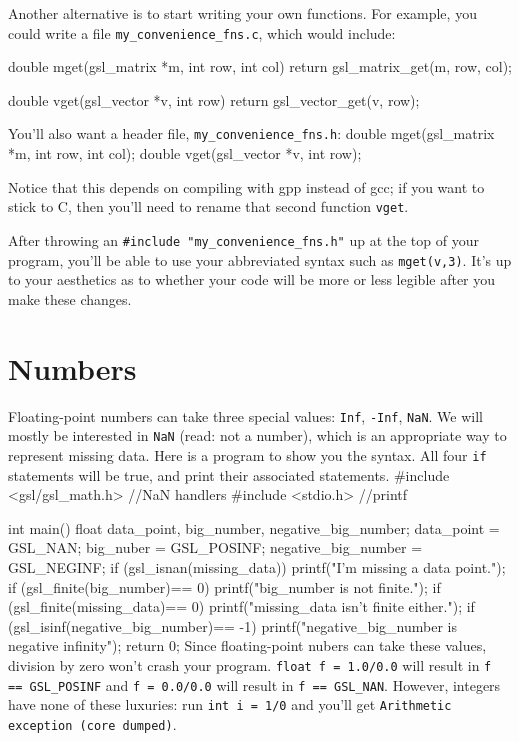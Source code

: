 Another alternative is to start writing your own functions. For example, you
could write a file {\tt my\_convenience\_fns.c}, which would include:

double mget(gsl_matrix *m, int row, int col){
   return gsl_matrix_get(m, row, col);
}

double vget(gsl_vector *v, int row){
   return gsl_vector_get(v, row);
}

You'll also want a header file, {\tt my\_convenience\_fns.h}:
double mget(gsl_matrix *m, int row, int col);
double vget(gsl_vector *v, int row);

Notice that this depends on compiling with gpp instead of gcc; if you want to
stick to C, then you'll need to rename that second function {\tt vget}.

After throwing an {\tt \#include "my\_convenience\_fns.h"} up at the top of your
program, you'll be able to use your abbreviated syntax such as {\tt mget(v,3)}.
It's up to your aesthetics as to whether your code will be more or less
legible after you make these changes. 


\section{Numbers}   
Floating-point numbers can take three special values: {\tt Inf}, {\tt -Inf}, {\tt NaN}. We will mostly be
interested in {\tt NaN} (read: not a number), which is an appropriate way to represent missing data. Here is a
program to show you the syntax. All four {\tt if} statements will be true, and print their associated
statements.
#include <gsl/gsl_math.h>   //NaN handlers
#include <stdio.h>          //printf

int main(){
float data_point, big_number, negative_big_number;
data_point = GSL_NAN;
big_nuber = GSL_POSINF;
negative_big_number = GSL_NEGINF;
if (gsl_isnan(missing_data))
    printf("I'm missing a data point.");
if (gsl_finite(big_number)== 0)
    printf("big_number is not finite.");
if (gsl_finite(missing_data)== 0)
    printf("missing_data isn't finite either.");
if (gsl_isinf(negative_big_number)== -1)
    printf("negative_big_number is negative infinity");
return 0;
}
Since floating-point nubers can take these values, division by zero
won't crash your program. {\tt float f = 1.0/0.0} will result in
{\tt f == GSL\_POSINF} and {\tt f = 0.0/0.0} will result in {\tt f ==
GSL\_NAN}. However, integers have none of these luxuries: run {\tt int
i = 1/0} and you'll get {\tt Arithmetic exception (core dumped)}.


